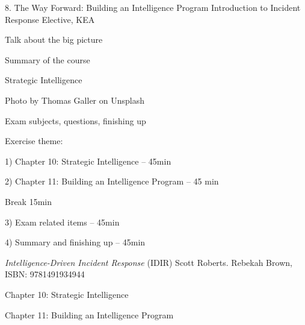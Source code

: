 \documentclass[Screen16to9,17pt]{foils}
\begin{document}
\mytitlepage
{8. The Way Forward: Building an Intelligence Program}
{Introduction to Incident Response Elective, KEA}




\begin{list2}
\item Talk about the big picture
\item Summary of the course
\item Strategic Intelligence
\end{list2}

{\hfill \small Photo by Thomas Galler on Unsplash}


\begin{list2}
\item
\item
\item
\item
\item Exam subjects, questions, finishing up
\end{list2}

Exercise theme:
\begin{list2}
\item
\item
\item
\end{list2}



\begin{list2}
\item 1) Chapter 10: Strategic Intelligence -- 45min
\item 2) Chapter 11: Building an Intelligence Program -- 45 min
\item Break 15min
\item 3) Exam related items -- 45min
\item 4) Summary and finishing up -- 45min
\end{list2}



\emph{Intelligence-Driven Incident Response} (IDIR)
 Scott Roberts. Rebekah Brown, ISBN: 9781491934944

\begin{quote}

\end{quote}

\begin{list2}
\item Chapter 10: Strategic Intelligence
\item Chapter 11: Building an Intelligence Program
\end{list2}
\end{document}
